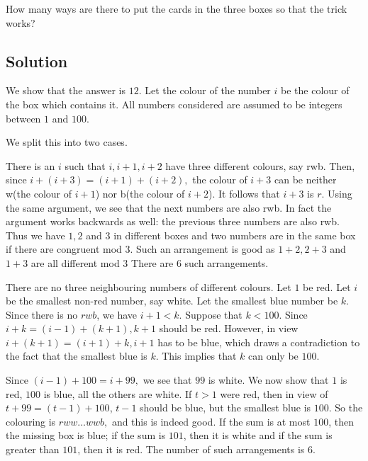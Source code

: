 \documentclass{article}
\begin{document}
How many ways are there to put the cards in the three boxes so that the trick works?

\subsection{Solution}

We show that the answer is $12$. Let the colour of the number $i$ be the colour of the box which contains it. All numbers considered are assumed to be integers between $1$ and $100$.

We split this into two cases.

\begin{itemize}
    \Item There is an $i$ such that $i, i + 1, i + 2$ have three different colours, say rwb. Then, since $i + (i + 3) = (i + 1) + (i + 2),$ the colour of $i + 3$ can be neither w(the colour of $i + 1$) nor b(the colour of $i + 2$). It follows that $i + 3$ is $r$. Using the same argument, we see that the next numbers are also rwb. In fact the argument works backwards as well: the previous three numbers are also rwb. Thus we have $1, 2$ and $3$ in different boxes and two numbers are in the same box if there are congruent mod $3$. Such an arrangement is good as $1 + 2, 2 + 3$ and $1 + 3 $ are all different mod $3$ There are $6$ such arrangements.

    \Item There are no three neighbouring numbers of different colours. Let $1$ be red. Let $i$ be the smallest non-red number, say white. Let the smallest blue number be $k$. Since there is no $rwb$, we have $i + 1 < k.$ Suppose that $k < 100$. Since $i + k = (i - 1) + (k + 1), k + 1$ should be red. However, in view  $i + (k + 1) = (i + 1) + k, i + 1$ has to be blue, which draws a contradiction to the fact that the smallest blue is $ k$. This implies that $k$ can only be $100$.

Since $(i - 1) + 100 = i + 99,$ we see that $99$ is white. We now show that $1$ is red, $100$ is blue, all the others are white. If $t > 1$ were red, then in view of $t + 99 = (t - 1) + 100$, $t - 1$ should be blue, but the smallest blue is $100.$ So the colouring is $rww\ldots wwb,$ and this is indeed good. If the sum is at most $100$, then the missing box is blue; if the sum is $101$, then it is white and if the sum is greater than $101$, then it is red. The number of such arrangements is $6$.
\end{itemize}
 
\end{document}
